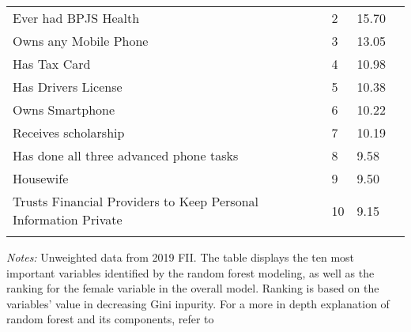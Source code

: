 \begin{table}[H]
\begin{adjustbox}{max width=1.3\textwidth}
\begin{threeparttable}
{\begin{tabular}{l*{1}{lll}}
Ever had BPJS Health&        2&    15.70\\
Owns any Mobile Phone&        3&    13.05\\
Has Tax Card    &        4&    10.98\\
Has Drivers License&        5&    10.38\\
Owns Smartphone &        6&    10.22\\
Receives scholarship&        7&    10.19\\
Has done all three advanced phone tasks&        8&     9.58\\
Housewife       &        9&     9.50\\
Trusts Financial Providers to Keep Personal Information Private&       10&     9.15\\
 \bottomrule \addlinespace[1.5ex] \end{tabular}} \begin{tablenotes}[flushleft]  \small \item \emph{Notes:} Unweighted data from 2019 FII. The table displays the ten most important variables identified by the random forest modeling, as well as the ranking for the female variable in the overall model. Ranking is based on the variables' value in decreasing Gini inpurity. For a more in depth explanation of random forest and its components, refer to \cite{rfart} \end{tablenotes} \end{threeparttable} \end{adjustbox} \end{table} \vspace*{-5mm}
